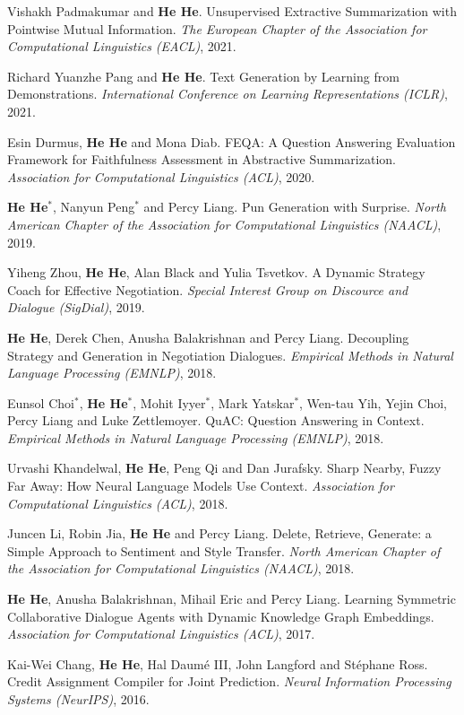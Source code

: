 Vishakh Padmakumar and \textbf{He He}. Unsupervised Extractive Summarization with Pointwise Mutual Information. \textit{The European Chapter of the Association for Computational Linguistics (EACL)}, 2021.

Richard Yuanzhe Pang and \textbf{He He}. Text Generation by Learning from Demonstrations. \textit{International Conference on Learning Representations (ICLR)}, 2021.

Esin Durmus, \textbf{He He} and Mona Diab. FEQA: A Question Answering Evaluation Framework for Faithfulness Assessment in Abstractive Summarization. \textit{Association for Computational Linguistics (ACL)}, 2020.

\textbf{He He}$^*$, Nanyun Peng$^*$ and Percy Liang. Pun Generation with Surprise. \textit{North American Chapter of the Association for Computational Linguistics (NAACL)}, 2019.

Yiheng Zhou, \textbf{He He}, Alan Black and Yulia Tsvetkov. A Dynamic Strategy Coach for Effective Negotiation. \textit{Special Interest Group on Discource and Dialogue (SigDial)}, 2019.

\textbf{He He}, Derek Chen, Anusha Balakrishnan and Percy Liang. Decoupling Strategy and Generation in Negotiation Dialogues. \textit{Empirical Methods in Natural Language Processing (EMNLP)}, 2018.

Eunsol Choi$^*$, \textbf{He He}$^*$, Mohit Iyyer$^*$, Mark Yatskar$^*$, Wen-tau Yih, Yejin Choi, Percy Liang and Luke Zettlemoyer. QuAC: Question Answering in Context. \textit{Empirical Methods in Natural Language Processing (EMNLP)}, 2018.

Urvashi Khandelwal, \textbf{He He}, Peng Qi and Dan Jurafsky. Sharp Nearby, Fuzzy Far Away: How Neural Language Models Use Context. \textit{Association for Computational Linguistics (ACL)}, 2018.

Juncen Li, Robin Jia, \textbf{He He} and Percy Liang. Delete, Retrieve, Generate: a Simple Approach to Sentiment and Style Transfer. \textit{North American Chapter of the Association for Computational Linguistics (NAACL)}, 2018.

\textbf{He He}, Anusha Balakrishnan, Mihail Eric and Percy Liang. Learning Symmetric Collaborative Dialogue Agents with Dynamic Knowledge Graph Embeddings. \textit{Association for Computational Linguistics (ACL)}, 2017.

Kai-Wei Chang, \textbf{He He}, Hal Daum\'e III, John Langford and St\'ephane Ross. Credit Assignment Compiler for Joint Prediction. \textit{Neural Information Processing Systems (NeurIPS)}, 2016.

